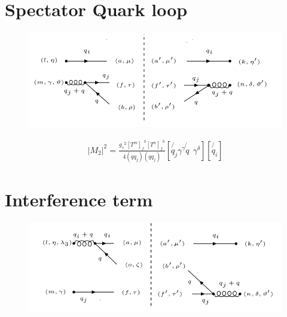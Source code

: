 \section{Spectator Quark loop}
\begin{figure}[ht!]
\centering
\includegraphics[scale=0.7]{images/QG/M2Squer.png}
\end{figure}

\begin{equation}
\begin{split}
|M_2|^2=\frac{{g_s}^2 {[T^m]_f}^b {[T^n]_{f}}^{b}}{4(qq_j)(qq_j)}[\not{q_j}{\gamma}^{\gamma}\not{q}\:\: {\gamma}^{{\delta}}][\not{q_i}]
\end{split}
\end{equation}

\pagebreak

\section{Interference term}
\begin{figure}[ht!]
\centering
\includegraphics[scale=0.7]{images/QG/M1M2Dagger.png}
\end{figure}
